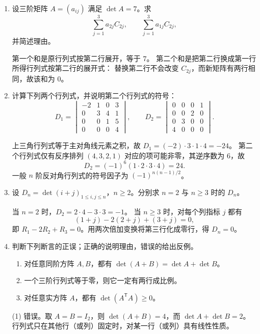 \documentclass[UTF8,12pt,a4paper,fontset=fandol]{ctexart}
\begin{document}
\begin{enumerate}[label=\arabic*.,series=detquestions]
\item\label{q:cofactor-sums}
设三阶矩阵 $A=(a_{ij})$ 满足 $\det A=7$。求
\[
\sum_{j=1}^{3}a_{2j}C_{2j},\qquad
\sum_{j=1}^{3}a_{1j}C_{2j},
\]
并简述理由。
\begin{solve}
第一个和是原行列式按第二行展开，等于 $7$。
第二个和是把第二行换成第一行所得行列式按第二行的展开式：
替换第二行不会改变 $C_{2j}$，而新矩阵有两行相同，故该和为 $0$。
\end{solve}

\item\label{q:triangular}
计算下列两个行列式，并说明第二个行列式的符号：
\[
D_1=\begin{vmatrix}-2&1&0&3\\0&3&4&1\\0&0&1&5\\0&0&0&4\end{vmatrix},
\qquad
D_2=\begin{vmatrix}0&0&0&1\\0&0&2&0\\0&3&0&0\\4&0&0&0\end{vmatrix}.
\]
\begin{solve}
上三角行列式等于主对角线元素之积，故 $D_1=(-2)\cdot3\cdot1\cdot4=-24$。
第二个行列式仅有反序排列 $(4,3,2,1)$ 对应的项可能非零，其逆序数为 $6$，故
\[
D_2=(-1)^6(1\cdot2\cdot3\cdot4)=24.
\]
一般 $n$ 阶反对角行列式的符号因子为 $(-1)^{n(n-1)/2}$。
\end{solve}

\item\label{q:dependent-rows}
设 $D_n=\det(i+j)_{1\leq i,j\leq n}$，$n\geq2$。分别求 $n=2$ 与 $n\geq3$ 时的 $D_n$。
\begin{solve}
当 $n=2$ 时，$D_2=2\cdot4-3\cdot3=-1$。
当 $n\geq3$ 时，对每个列指标 $j$ 都有
\[
(1+j)-2(2+j)+(3+j)=0,
\]
即 $R_1-2R_2+R_3=0$。用两次倍加变换将第三行化成零行，得 $D_n=0$。
\end{solve}

\item\label{q:true-false}
判断下列断言的正误；正确的说明理由，错误的给出反例。
\begin{enumerate}[label=(\arabic*)]
\item 对任意同阶方阵 $A,B$，都有 $\det(A+B)=\det A+\det B$。
\item 一个三阶行列式等于零，则它一定有两行成比例。
\item 对任意实方阵 $A$，都有 $\det(A^{\mathsf T}A)\geq0$。
\end{enumerate}
\begin{solve}
(1) 错误。取 $A=B=I_2$，则 $\det(A+B)=4$，而 $\det A+\det B=2$。
行列式只在其他行（或列）固定时，对某一行（或列）具有线性性质。


\end{solve}
\end{enumerate}
\end{document}
